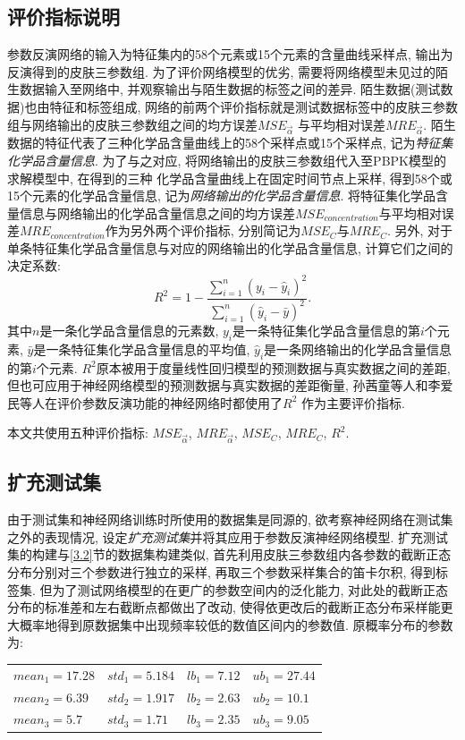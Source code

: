\documentclass[a4paper,punct=banjiao,twoside]{ctexrep}
\theoremstyle{plain}
\theoremstyle{definition}
\theoremstyle{remark}
\begin{document}
\subsection*{评价指标说明}
参数反演网络的输入为特征集内的58个元素或15个元素的含量曲线采样点, 输出为反演得到的皮肤三参数组. 
为了评价网络模型的优劣, 需要将网络模型未见过的陌生数据输入至网络中, 并观察输出与陌生数据的标签之间的差异.
陌生数据(测试数据)也由特征和标签组成, 网络的前两个评价指标就是测试数据标签中的皮肤三参数组与网络输出的皮肤三参数组之间的均方误差$MSE_{\vec{\alpha}}$
与平均相对误差$MRE_{\vec{\alpha}}$.
陌生数据的特征代表了三种化学品含量曲线上的58个采样点或15个采样点, 记为\textit{特征集化学品含量信息}. 为了与之对应, 将网络输出的皮肤三参数组代入至PBPK模型的求解模型中, 在得到的三种
化学品含量曲线上在固定时间节点上采样, 得到58个或15个元素的化学品含量信息, 记为\textit{网络输出的化学品含量信息}.
将特征集化学品含量信息与网络输出的化学品含量信息之间的均方误差$MSE_{concentration}$与平均相对误差$MRE_{concentration}$作为另外两个评价指标, 分别简记为$MSE_{C}$与$MRE_{C}$.
另外, 对于单条特征集化学品含量信息与对应的网络输出的化学品含量信息, 计算它们之间的决定系数\cite{26}:
$$
R^2 = 1 - \frac{\sum_{i=1}^{n} (y_i - \hat{y}_i)^2}{\sum_{i=1}^{n} (\hat{y}_i - \bar{y})^2 }.
$$
其中$n$是一条化学品含量信息的元素数, $y_i$是一条特征集化学品含量信息的第$i$个元素, $\bar{y}$是一条特征集化学品含量信息的平均值, $\hat{y}_i$是一条网络输出的化学品含量信息的第$i$个元素.
$R^2$原本被用于度量线性回归模型的预测数据与真实数据之间的差距\cite{26}, 但也可应用于神经网络模型的预测数据与真实数据的差距衡量, 孙茜童等人和李爱民等人\cite{27,28}在评价参数反演功能的神经网络时都使用了$R^2$
作为主要评价指标.

本文共使用五种评价指标: $MSE_{\vec{\alpha}}$, $MRE_{\vec{\alpha}}$, $MSE_{C}$, $MRE_{C}$, $R^2$.

\subsection*{扩充测试集}
由于测试集和神经网络训练时所使用的数据集是同源的, 欲考察神经网络在测试集之外的表现情况, 设定\textit{扩充测试集}并将其应用于参数反演神经网络模型. 
扩充测试集的构建与\ref{3.2}节的数据集构建类似, 首先利用皮肤三参数组内各参数的截断正态分布分别对三个参数进行独立的采样, 再取三个参数采样集合的笛卡尔积, 得到标签集.
但为了测试网络模型的在更广的参数空间内的泛化能力, 对此处的截断正态分布的标准差和左右截断点都做出了改动, 使得依更改后的截断正态分布采样能更大概率地得到原数据集中出现频率较低的数值区间内的参数值.
原概率分布的参数为:
\begin{table}[htbp]
  \centering
  \begin{tabular}[t]{|l*{3}{l}|}

    $mean_1 = 17.28$ &$std_1 = 5.184$ &$lb_1 = 7.12$ &$ub_1 =27.44$  \\ 
  
    $mean_2 = 6.39$  &$std_2 = 1.917$ &$lb_2 = 2.63$ &$ ub_2 =10.1$  \\ 
  
    $mean_3 = 5.7$ &$std_3 = 1.71$  &$lb_3 = 2.35$ &$ub_3 =9.05$ \\ 

  \end{tabular}
\end{table}  
\end{document}
